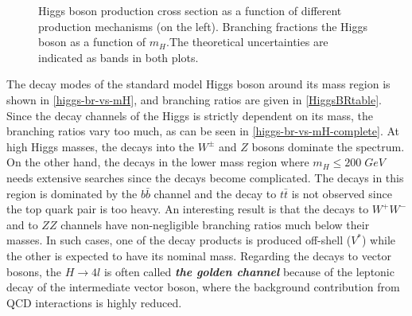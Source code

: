 \begin{figure}[ht]
\begin{subfigure}[b]{0.475\textwidth}
            \vspace{-0.75cm}
            \label{higgs-br-vs-mH}
        \end{subfigure}
        \caption[Higgs boson production cross section as a function of different production mechanisms (on the left). Branching fractions the Higgs boson as a function of $m_H$ .The theoretical uncertainties are indicated as bands in both plots.]
        {\small Higgs boson production cross section as a function of different production mechanisms\cite{higg-phen-3} (on the left). Branching fractions the Higgs boson as a function of $m_H$\cite{higgs-br-vs-mH}.The theoretical uncertainties are indicated as bands in both plots.}
\end{figure}

The decay modes of the standard model Higgs boson around its mass region is shown in \autoref{higgs-br-vs-mH}, and branching ratios are given in \autoref{HiggsBRtable}. Since the decay channels of the Higgs is strictly dependent on its mass, the branching ratios vary too much, as can be seen in \autoref{higgs-br-vs-mH-complete}. At high Higgs masses, the decays into the $W^\pm$ and $Z$ bosons dominate the spectrum.  On the other hand, the decays in the lower mass region where $m_H \le 200\; GeV$ needs extensive searches since the decays become complicated. The decays in this region is dominated by the $b\bar b$ channel and the decay to $t\bar t$ is not observed since the top quark pair is too heavy. An interesting result is that the decays to $W^+W^-$ and to $ZZ$ channels have non-negligible branching ratios much below their masses. In such cases, one of the decay products is produced off-shell ($V^*$) while the other is expected to have its nominal mass. Regarding the decays to vector bosons, the $H\rightarrow 4l$ is often called \emph{\textbf{the golden channel}} because of the leptonic decay of the intermediate vector boson, where the background contribution from QCD interactions is highly reduced.

